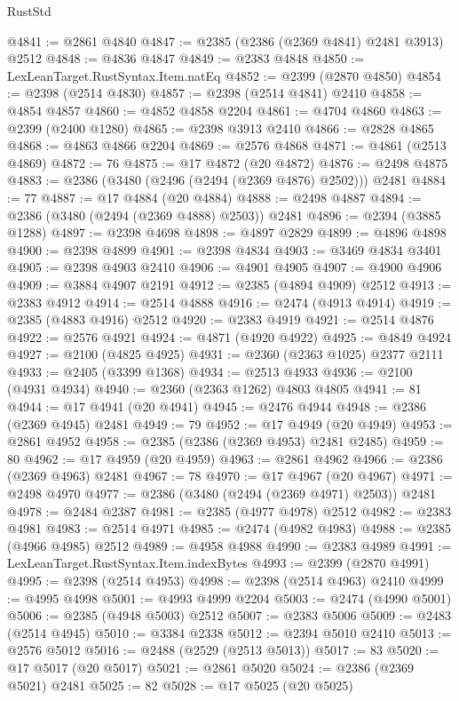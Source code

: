 \begin{lexlean}{RustStd}
\begin{coremodule}
{\begin{coremodule}
{{{{{{{{{{{{{{{{{{{{{{{{{{{{{{{{{{{{{{{{{{{{{{{{{{@4841 := @2861 @4840
@4847 := @2385 (@2386 (@2369 @4841) @2481 @3913) @2512
@4848 := @4836 @4847
@4849 := @2383 @4848
@4850 := LexLeanTarget.RustSyntax.Item.natEq
@4852 := @2399 (@2870 @4850)
@4854 := @2398 (@2514 @4830)
@4857 := @2398 (@2514 @4841) @2410
@4858 := @4854 @4857
@4860 := @4852 @4858 @2204
@4861 := @4704 @4860
@4863 := @2399 (@2400 @1280)
@4865 := @2398 @3913 @2410
@4866 := @2828 @4865
@4868 := @4863 @4866 @2204
@4869 := @2576 @4868
@4871 := @4861 (@2513 @4869)
@4872 := 76
@4875 := @17 @4872 (@20 @4872)
@4876 := @2498 @4875
@4883 := @2386 (@3480 (@2496 (@2494 (@2369 @4876) @2502))) @2481
@4884 := 77
@4887 := @17 @4884 (@20 @4884)
@4888 := @2498 @4887
@4894 := @2386 (@3480 (@2494 (@2369 @4888) @2503)) @2481
@4896 := @2394 (@3885 @1288)
@4897 := @2398 @4698
@4898 := @4897 @2829
@4899 := @4896 @4898
@4900 := @2398 @4899
@4901 := @2398 @4834
@4903 := @3469 @4834 @3401
@4905 := @2398 @4903 @2410
@4906 := @4901 @4905
@4907 := @4900 @4906
@4909 := @3884 @4907 @2191
@4912 := @2385 (@4894 @4909) @2512
@4913 := @2383 @4912
@4914 := @2514 @4888
@4916 := @2474 (@4913 @4914)
@4919 := @2385 (@4883 @4916) @2512
@4920 := @2383 @4919
@4921 := @2514 @4876
@4922 := @2576 @4921
@4924 := @4871 (@4920 @4922)
@4925 := @4849 @4924
@4927 := @2100 (@4825 @4925)
@4931 := @2360 (@2363 @1025) @2377 @2111
@4933 := @2405 (@3399 @1368)
@4934 := @2513 @4933
@4936 := @2100 (@4931 @4934)
@4940 := @2360 (@2363 @1262) @4803 @4805
@4941 := 81
@4944 := @17 @4941 (@20 @4941)
@4945 := @2476 @4944
@4948 := @2386 (@2369 @4945) @2481
@4949 := 79
@4952 := @17 @4949 (@20 @4949)
@4953 := @2861 @4952
@4958 := @2385 (@2386 (@2369 @4953) @2481 @2485)
@4959 := 80
@4962 := @17 @4959 (@20 @4959)
@4963 := @2861 @4962
@4966 := @2386 (@2369 @4963) @2481
@4967 := 78
@4970 := @17 @4967 (@20 @4967)
@4971 := @2498 @4970
@4977 := @2386 (@3480 (@2494 (@2369 @4971) @2503)) @2481
@4978 := @2484 @2387
@4981 := @2385 (@4977 @4978) @2512
@4982 := @2383 @4981
@4983 := @2514 @4971
@4985 := @2474 (@4982 @4983)
@4988 := @2385 (@4966 @4985) @2512
@4989 := @4958 @4988
@4990 := @2383 @4989
@4991 := LexLeanTarget.RustSyntax.Item.indexBytes
@4993 := @2399 (@2870 @4991)
@4995 := @2398 (@2514 @4953)
@4998 := @2398 (@2514 @4963) @2410
@4999 := @4995 @4998
@5001 := @4993 @4999 @2204
@5003 := @2474 (@4990 @5001)
@5006 := @2385 (@4948 @5003) @2512
@5007 := @2383 @5006
@5009 := @2483 (@2514 @4945)
@5010 := @3384 @2338
@5012 := @2394 @5010 @2410
@5013 := @2576 @5012
@5016 := @2488 (@2529 (@2513 @5013))
@5017 := 83
@5020 := @17 @5017 (@20 @5017)
@5021 := @2861 @5020
@5024 := @2386 (@2369 @5021) @2481
@5025 := 82
@5028 := @17 @5025 (@20 @5025)
}}}}}}}}}}}}}}}}}}}}}}}}}}}}}}}}}}}}}}}}}}}}}}}}}}
\end{coremodule}}
\end{coremodule}
\end{lexlean}
